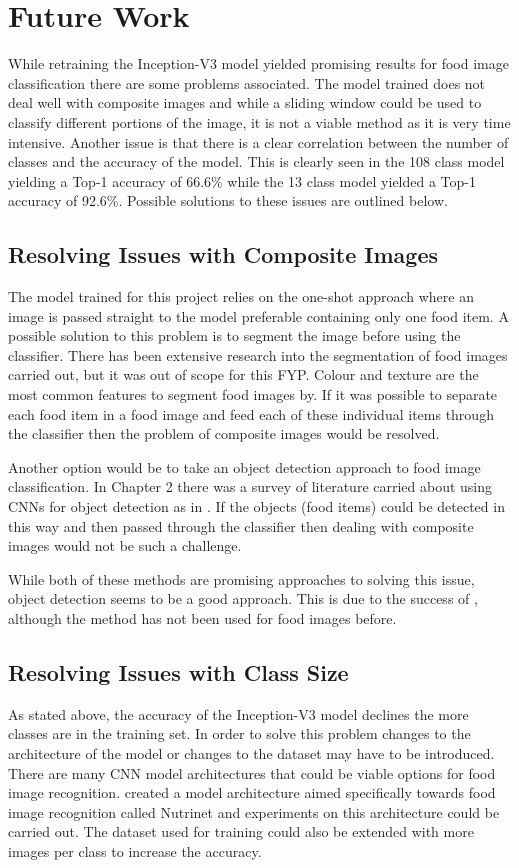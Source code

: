 

\section{Future Work}
While retraining the Inception-V3 model yielded promising results for food image classification there are some problems associated.
The model trained does not deal well with composite images and while a sliding window could be used to classify different portions of the image, it is not a viable method as it is very time intensive.
Another issue is that there is a clear correlation between the number of classes and the accuracy of the model.
This is clearly seen in the 108 class model yielding a Top-1 accuracy of 66.6\% while the 13 class model yielded a Top-1 accuracy of 92.6\%.
Possible solutions to these issues are outlined below.

\tocless\subsection{Resolving Issues with Composite Images}
The model trained for this project relies on the one-shot approach where an image is passed straight to the model preferable containing only one food item.
A possible solution to this problem is to segment the image before using the classifier.
There has been extensive research into the segmentation of food images carried out, but it was out of scope for this FYP.
Colour and texture are the most common features to segment food images by.
If it was possible to separate each food item in a food image and feed each of these individual items through the classifier then the problem of composite images would be resolved.

Another option would be to take an object detection approach to food image classification.
In Chapter 2 there was a survey of literature carried about
using CNNs for object detection as in \parencite{maskRcnn}.
If the objects (food items) could be detected in this way and then passed through the classifier then dealing with composite images would not be such a challenge.

While both of these methods are promising approaches to solving this issue, object detection seems to be a good approach. This is due to the success of \parencite{maskRcnn}, although the method has not been used for food images before.

\tocless\subsection{Resolving Issues with Class Size}
As stated above, the accuracy of the Inception-V3 model declines the more classes are in the training set.
In order to solve this problem changes to the architecture of the model or
changes to the dataset may have to be introduced.
There are many CNN model architectures that could be viable options for food image recognition.
\parencite{nutrinet} created a model architecture aimed specifically towards food image recognition called Nutrinet and experiments on this architecture could be carried out.
The dataset used for training could also be extended with more images per class to increase the accuracy.
